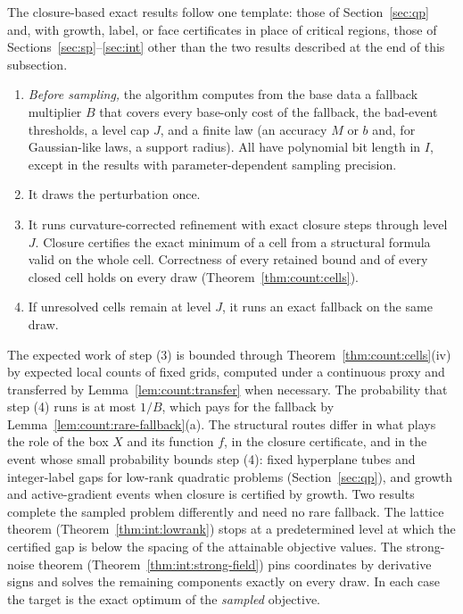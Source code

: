 The closure-based exact results follow one template: those of
Section~\ref{sec:qp} and, with growth, label, or face certificates in place
of critical regions, those of Sections~\ref{sec:sp}--\ref{sec:int} other than
the two results described at the end of this subsection.
\begin{enumerate}[label=(\arabic*)]
\item \emph{Before sampling,} the algorithm computes from the base data a
 fallback multiplier $B$ that covers every base-only cost of the fallback,
 the bad-event thresholds, a level cap $J$, and a finite law (an accuracy $M$
 or $b$ and, for Gaussian-like laws, a support radius). All have polynomial
 bit length in $I$, except in the results with parameter-dependent sampling
 precision.
\item It draws the perturbation once.
\item It runs curvature-corrected refinement with exact closure steps through
 level $J$. Closure certifies the exact minimum of a cell from a structural
 formula valid on the whole cell. Correctness of every retained bound and of
 every closed cell holds on every draw (Theorem~\ref{thm:count:cells}).
\item If unresolved cells remain at level $J$, it runs an exact fallback on
 the same draw.
\end{enumerate}
The expected work of step (3) is bounded through
Theorem~\ref{thm:count:cells}(iv) by expected local counts of fixed grids,
computed under a continuous proxy and transferred by
Lemma~\ref{lem:count:transfer} when necessary. The probability that step
(4) runs is at most $1/B$, which pays for the fallback by
Lemma~\ref{lem:count:rare-fallback}(a). The structural routes differ in what
plays the role of the box $X$ and its function $f$, in the closure
certificate, and in the event whose small probability bounds step (4):
fixed hyperplane tubes and integer-label gaps for low-rank quadratic
problems (Section~\ref{sec:qp}), and growth and active-gradient events when
closure is certified by growth. Two results complete the sampled problem
differently and need no rare fallback. The lattice theorem
(Theorem~\ref{thm:int:lowrank}) stops at a predetermined level at which the
certified gap is below the spacing of the attainable objective values. The
strong-noise theorem (Theorem~\ref{thm:int:strong-field}) pins coordinates by
derivative signs and solves the remaining components exactly on every draw.
In each case the target is the exact optimum of the \emph{sampled} objective.

